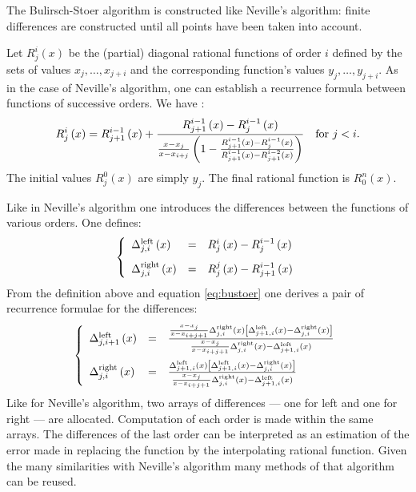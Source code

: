 \documentclass[twoside]{book}
\begin{document}
The Bulirsch-Stoer algorithm is constructed like Neville's
algorithm: finite differences are constructed until all points
have been taken into account.

Let $R_j^i\left(x\right)$ be the (partial) diagonal rational
functions of order $i$ defined by the sets of values
$x_j,\ldots,x_{j+i}$ and the corresponding function's values
$y_j,\ldots,y_{j+i}$. As in the case of Neville's algorithm, one
can establish a recurrence formula between functions of successive
orders. We have \cite{Press}:
\begin{equation}
\label{eq:bustoer}
R_j^i\left(x\right)=R_{j+1}^{i-1}\left(x\right)+
{R_{j+1}^{i-1}\left(x\right) - R_j^{i-1}\left(x\right) \over
{x-x_j\over x-x_{i+j}}\left(1-{R_{j+1}^{i-1}\left(x\right)
-R_j^{i-1}\left(x\right)\over R_{j+1}^{i-1}\left(x\right)
-R_{j+1}^{i-2}\left(x\right)}\right)}\mbox{\quad for $j<i$}.
\end{equation}
The initial values $R_j^0\left(x\right)$ are simply $y_j$. The
final rational function is $R_0^n\left(x\right)$.

Like in Neville's algorithm one introduces the differences between
the functions of various orders. One defines:
\begin{equation}
\left\{
\begin{array}{lcl}
    \Delta_{j,i}^{\mathop{\rm
left}}\left(x\right) & = & R_j^i\left(x\right) -
R_j^{i-1}\left(x\right)\\*[2ex]
    \Delta_{j,i}^{\mathop{\rm
right}}\left(x\right) & = & R_j^j\left(x\right) -
R_{j+1}^{i-1}\left(x\right)
  \end{array}\right.
\end{equation}
From the definition above and equation \ref{eq:bustoer} one
derives a pair of recurrence formulae for the differences:
\begin{equation}
\left\{
\begin{array}{lcl}
    \Delta_{j,i+1}^{\mathop{\rm
left}}\left(x\right) & = &{{x-x_j \over x - x_{i+j+1}}
\Delta_{j,i}^{\mathop{\rm right}}\left(x\right)
\left[\Delta_{j+1,i}^{\mathop{\rm left}}\left(x\right) -
\Delta_{j,i}^{\mathop{\rm right}}\left(x\right)\right] \over
{x-x_j \over x-x_{i+j+1}} \Delta_{j,i}^{\mathop{\rm
right}}\left(x\right) - \Delta_{j+1,i}^{\mathop{\rm
left}}\left(x\right)}
\\*[3ex]
    \Delta_{j,i}^{\mathop{\rm
right}}\left(x\right) & = &{ \Delta_{j+1,i}^{\mathop{\rm
left}}\left(x\right) \left[\Delta_{j+1,i}^{\mathop{\rm
left}}\left(x\right) - \Delta_{j,i}^{\mathop{\rm
right}}\left(x\right)\right] \over {x-x_j \over x-x_{i+j+1}}
\Delta_{j,i}^{\mathop{\rm right}}\left(x\right) -
\Delta_{j+1,i}^{\mathop{\rm left}}\left(x\right)}
  \end{array}\right.
\end{equation}
Like for Neville's algorithm, two arrays of differences --- one
for left and one for right --- are allocated. Computation of each
order is made within the same arrays. The differences of the last
order can be interpreted as an estimation of the error made in
replacing the function by the interpolating rational function.
Given the many similarities with Neville's algorithm many methods
of that algorithm can be reused.
\end{document}
